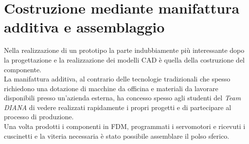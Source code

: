 \documentclass[%
corpo=11pt,
twoside,
 stile=classica,
oldstyle,
greek,%
]{toptesi}
\begin{document}
		
	

	
\clearpage
\chapter{Costruzione mediante manifattura additiva e assemblaggio}
Nella realizzazione di un prototipo la parte indubbiamente più interessante dopo la progettazione e la realizzazione dei modelli CAD è quella della costruzione del componente.\\
 La manifattura additiva, al contrario delle tecnologie tradizionali che spesso richiedono una dotazione di macchine da officina e materiali da lavorare disponibili presso un'azienda esterna, ha concesso spesso agli studenti del \textit{Team DIANA} di vedere realizzati rapidamente i propri progetti e di partecipare al processo di produzione.\\
  Una volta prodotti i componenti in FDM, programmati i servomotori e ricevuti i cuscinetti e la viteria necessaria è stato possibile assemblare il polso sferico. 
\end{document}
